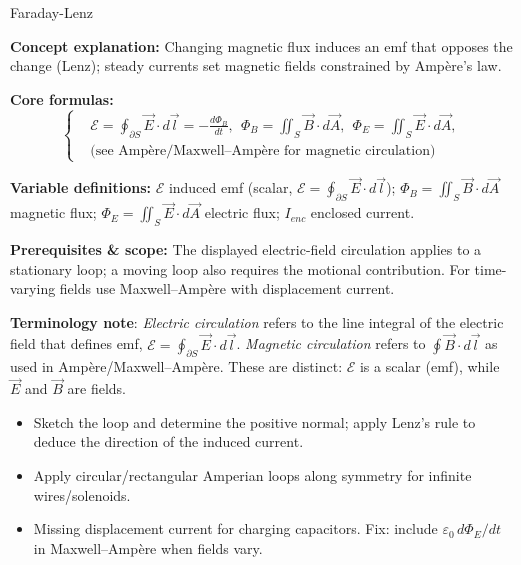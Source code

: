 \begin{KnowledgePoint}{Faraday-Lenz \Core}
  \KPFormulas
\begin{formulabox}
  \textbf{Concept explanation:} Changing magnetic flux induces an emf that opposes the change (Lenz); steady currents set magnetic fields constrained by Amp\`ere's law.

  \textbf{Core formulas:}
  \[
  \left\{\begin{aligned}
    &\mathcal E=\oint_{\partial S}\vec E\cdot d\vec l=-\frac{d\Phi_B}{dt},\ \ \Phi_B=\iint_S \vec B\cdot d\vec A,\ \ \Phi_E=\iint_S \vec E\cdot d\vec A,\\
    &\text{(see Amp\`ere/Maxwell--Amp\`ere for magnetic circulation)}
  \end{aligned}\right.
  \]

  \textbf{Variable definitions:} $\mathcal E$ induced emf (scalar, $\mathcal E=\oint_{\partial S}\vec E\cdot d\vec l$); $\Phi_B=\iint_S \vec B\cdot d\vec A$ magnetic flux; $\Phi_E=\iint_S \vec E\cdot d\vec A$ electric flux; $I_{enc}$ enclosed current.
  
  \textbf{Prerequisites \& scope:} The displayed electric-field circulation applies to a stationary loop; a moving loop also requires the motional contribution. For time-varying fields use Maxwell--Amp\`ere with displacement current.
  \end{formulabox}

  \begin{insightbox}
  \textbf{Terminology note}: \emph{Electric circulation} refers to the line integral of the electric field that defines emf, $\mathcal E=\oint_{\partial S}\vec E\cdot d\vec l$. \emph{Magnetic circulation} refers to $\oint\vec B\cdot d\vec l$ as used in Amp\`ere/Maxwell--Amp\`ere. These are distinct: $\mathcal E$ is a scalar (emf), while $\vec E$ and $\vec B$ are fields.
  \end{insightbox}

  \KPHeuristics
  \begin{heuristicsbox}
  \begin{itemize}[leftmargin=*]
    \item Sketch the loop and determine the positive normal; apply Lenz's rule to deduce the direction of the induced current.
    \item Apply circular/rectangular Amperian loops along symmetry for infinite wires/solenoids.
  \end{itemize}
  \vspace{0.4em}
  \begin{itemize}[leftmargin=*]
    \item Missing displacement current for charging capacitors. Fix: include $\varepsilon_0\,d\Phi_E/dt$ in Maxwell–Amp\`ere when fields vary.
  \end{itemize}
  \end{heuristicsbox}


\end{KnowledgePoint}
